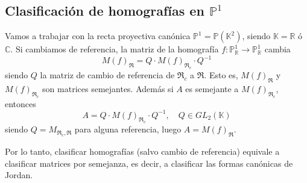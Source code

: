 \subsection{Clasificación de homografías en $\mathbb{P}^1$}

Vamos a trabajar con la recta proyectiva canónica $\mathbb{P}^1 = \mathbb{P}(\mathbb{K}^2)$, siendo $\mathbb{K} = \mathbb{R}$ ó $\mathbb{C}$. Si cambiamos de referencia, la matriz de la homografía $f: \mathbb{P}^1_{\mathbb{R}} \to \mathbb{P}^1_{\mathbb{R}}$ cambia 
\[
    M(f)_{\mathfrak{R}} = Q \cdot M(f)_{\mathfrak{R}_c} \cdot Q^{-1}
\]
siendo $Q$ la matriz de cambio de referencia de $\mathfrak{R}_c$ a $\mathfrak{R}$. Esto es, $M(f)_{\mathfrak{R}}$ y $M(f)_{\mathfrak{R}_c}$ son matrices semejantes. Además si $A$ es semejante a $M(f)_{\mathfrak{R}_c}$, entonces 
\[
    A = Q \cdot M(f)_{\mathfrak{R}_c} \cdot Q^{-1}, \quad Q \in GL_2(\mathbb{K})
\]
siendo $Q = M_{\mathfrak{R}_c, \mathfrak{R}}$ para alguna referencia, luego $A = M(f)_{\mathfrak{R}}$.

Por lo tanto, clasificar homografías (salvo cambio de referencia) equivale a clasificar matrices por semejanza, es decir, a clasificar las formas canónicas de Jordan.

